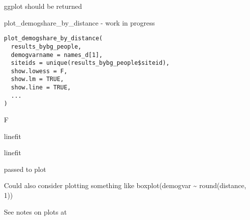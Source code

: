 \documentclass[a4paper]{book}
\begin{document}
%
\begin{Value}
ggplot should be returned
\end{Value}
%
\begin{SeeAlso}\relax
{} 
\end{SeeAlso}
%
\begin{Examples}
\end{Examples}
%
\begin{Description}\relax
plot\_demogshare\_by\_distance - work in progress
\end{Description}
%
\begin{Usage}
\begin{verbatim}
plot_demogshare_by_distance(
  results_bybg_people,
  demogvarname = names_d[1],
  siteids = unique(results_bybg_people$siteid),
  show.lowess = F,
  show.lm = TRUE,
  show.line = TRUE,
  ...
)
\end{verbatim}
\end{Usage}
%
\begin{Arguments}
\begin{ldescription}
\item[\code{results\_bybg\_people}] 

\item[\code{demogvarname}] 

\item[\code{siteids}] 

\item[\code{show.lowess}] F

\item[\code{show.lm}] linefit

\item[\code{show.line}] linefit

\item[\code{...}] passed to plot
\end{ldescription}
\end{Arguments}
%
\begin{Details}\relax
Could also consider plotting something like boxplot(demogvar \textasciitilde{} round(distance, 1))

See notes on plots at 
\end{Details}
\end{document}
